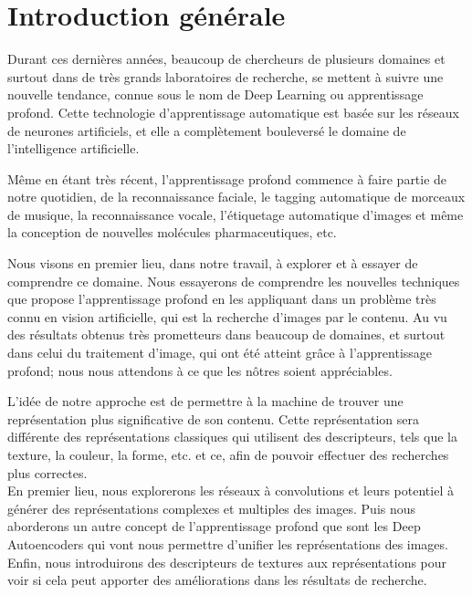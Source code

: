 
\chapter*{Introduction générale} %

	Durant ces dernières années, beaucoup de chercheurs de plusieurs domaines et surtout dans de très grands laboratoires de recherche, se mettent à suivre une nouvelle tendance, connue sous le nom de Deep Learning ou apprentissage profond. Cette technologie d'apprentissage automatique est basée sur les réseaux de neurones artificiels, et elle a complètement bouleversé le domaine de l'intelligence artificielle.
	
	Même en étant très récent, l'apprentissage profond commence à faire partie de notre quotidien, de la reconnaissance faciale, le tagging automatique de morceaux de musique, la reconnaissance vocale, l'étiquetage automatique d’images et même la conception de nouvelles molécules pharmaceutiques, etc.

	Nous visons en premier lieu, dans notre travail, à explorer et à essayer de comprendre ce domaine. Nous essayerons de comprendre les nouvelles techniques que propose l'apprentissage profond en les appliquant dans un problème très connu en vision artificielle, qui est la recherche d'images par le contenu. Au vu des résultats obtenus très prometteurs dans beaucoup de domaines, et surtout dans celui du traitement d'image, qui ont été atteint grâce à l'apprentissage profond; nous nous attendons à ce que les nôtres soient appréciables.
	
	L’idée de notre approche est de permettre à la machine de trouver une représentation plus significative de son contenu. Cette représentation sera différente des représentations classiques qui utilisent des descripteurs, tels que la texture, la couleur, la forme, etc. et ce, afin de pouvoir effectuer des recherches plus correctes.\\

	En premier lieu, nous explorerons les réseaux à convolutions et leurs potentiel à générer des représentations complexes et multiples des images. Puis nous aborderons un autre concept de l'apprentissage profond que sont les Deep Autoencoders qui vont nous permettre d'unifier les représentations des images. Enfin, nous introduirons des descripteurs de textures aux représentations pour voir si cela peut apporter des améliorations dans les résultats de recherche.\\

